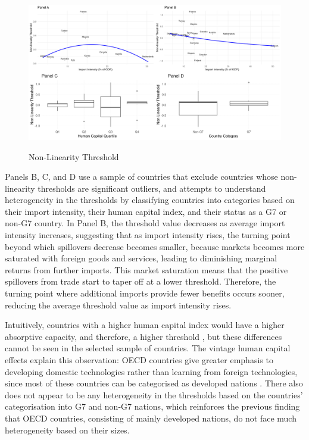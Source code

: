 \documentclass[12pt]{article}
\begin{document}
\begin{figure}[ht!]
    \centering
    \doublespacing
    \caption{Non-Linearity Threshold}
    \includegraphics[width=1\linewidth]{NL.png}
    \label{fig: threshold}
\end{figure}

Panels B, C, and D use a sample of countries that exclude countries whose non-linearity thresholds are significant outliers, and attempts to understand heterogeneity in the thresholds by classifying countries into categories based on their import intensity, their human capital index, and their status as a G7 or non-G7 country. In Panel B, the threshold value decreases as average import intensity increases, suggesting that as import intensity rises, the turning point beyond which spillovers decrease becomes smaller, because markets becomes more saturated with foreign goods and services, leading to diminishing marginal returns from further imports. This market saturation means that the positive spillovers from trade start to taper off at a lower threshold. Therefore, the turning point where additional imports provide fewer benefits occurs sooner, reducing the average threshold value as import intensity rises.

Intuitively, countries with a higher human capital index would have a higher absorptive capacity, and therefore, a higher threshold \citep{Kneller2006}, but these differences cannot be seen in the selected sample of countries. The vintage human capital effects \citep{Chari1991, Comin2004} explain this observation: OECD countries give greater emphasis to developing domestic technologies rather than learning from foreign technologies, since most of these countries can be categorised as developed nations \citep{Coe1995}. There also does not appear to be any heterogeneity in the thresholds based on the countries' categorisation into G7 and non-G7 nations, which reinforces the previous finding that OECD countries, consisting of mainly developed nations, do not face much heterogeneity based on their sizes. 
\end{document}
